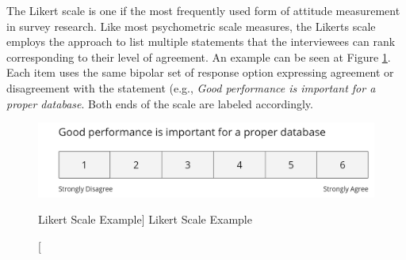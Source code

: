     The Likert scale is one if the most frequently used form of attitude measurement in survey research. Like most psychometric scale measures, the Likerts scale employs the approach to list multiple statements that the interviewees can rank corresponding to their level of agreement. An example can be seen at Figure \ref{fig:likertExample}. Each item uses the same bipolar set of response option expressing agreement or disagreement with the statement (e.g., \textit{Good performance is important for a proper database}. Both ends of the scale are labeled accordingly. \autocite{Brill2008LikertScale}
    
    \begin{figure}[ht]
        \includegraphics[width=\linewidth]{images/methodology/likert.PNG}\centering
        \caption
        [Likert Scale Example]
        {Likert Scale Example}
        \label{fig:likertExample}
    \end{figure}
    
    

